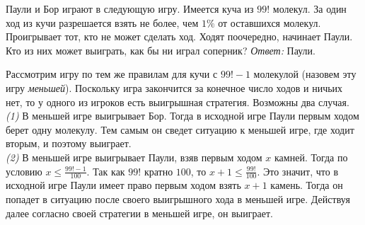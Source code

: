 \problem
Паули и Бор играют в следующую игру.
Имеется куча из $99!$ молекул.
За один ход из кучи разрешается взять не более, чем $1\%$ от оставшихся
молекул.
Проигрывает тот, кто не может сделать ход.
Ходят поочередно, начинает Паули.
Кто из них может выиграть, как бы ни играл соперник?
\solution
\emph{Ответ:} Паули.
\par
Рассмотрим игру по тем же правилам для кучи с $99! - 1$ молекулой
(назовем эту игру \emph{меньшей}).
Поскольку игра закончится за конечное число ходов и ничьих нет, то у одного из
игроков есть выигрышная стратегия.
Возможны два случая.
\\\emph{(1)}
В меньшей игре выигрывает Бор.
Тогда в исходной игре Паули первым ходом берет одну молекулу.
Тем самым он сведет ситуацию к меньшей игре, где ходит вторым, и поэтому
выиграет.
\\\emph{(2)}
В меньшей игре выигрывает Паули, взяв первым ходом $x$ камней.
Тогда по условию $x \leq \frac{99! - 1}{100}$.
Так как $99!$ кратно $100$, то $x + 1 \leq \frac{99!}{100}$.
Это значит, что в исходной игре Паули имеет право первым ходом взять $x + 1$
камень.
Тогда он попадет в ситуацию после своего выигрышного хода в меньшей игре.
Действуя далее согласно своей стратегии в меньшей игре, он выиграет.
\endproblem
